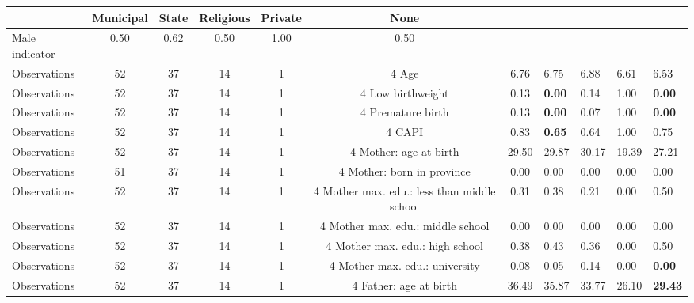 \begin{tabular}{l c c c c c c }
\toprule
& \textbf{Municipal} & \textbf{State} & \textbf{Religious} & \textbf{Private} & \textbf{None} \\
\midrule
Male indicator &      0.50 &      0.62 &      0.50 &      1.00 &      0.50 \\
\midrule
Observations &        52 &        37 &        14 &         1 &         4
Age &      6.76 &      6.75 &      6.88 &      6.61 &      6.53 \\
\midrule
Observations &        52 &        37 &        14 &         1 &         4
Low birthweight &      0.13 & \textbf{     0.00} &      0.14 &      1.00 & \textbf{     0.00} \\
\midrule
Observations &        52 &        37 &        14 &         1 &         4
Premature birth &      0.13 & \textbf{     0.00} &      0.07 &      1.00 & \textbf{     0.00} \\
\midrule
Observations &        52 &        37 &        14 &         1 &         4
CAPI &      0.83 & \textbf{     0.65} &      0.64 &      1.00 &      0.75 \\
\midrule
Observations &        52 &        37 &        14 &         1 &         4
Mother: age at birth &     29.50 &     29.87 &     30.17 &     19.39 &     27.21 \\
\midrule
Observations &        51 &        37 &        14 &         1 &         4
Mother: born in province &      0.00 &      0.00 &      0.00 &      0.00 &      0.00 \\
\midrule
Observations &        52 &        37 &        14 &         1 &         4
Mother max. edu.: less than middle school &      0.31 &      0.38 &      0.21 &      0.00 &      0.50 \\
\midrule
Observations &        52 &        37 &        14 &         1 &         4
Mother max. edu.: middle school &      0.00 &      0.00 &      0.00 &      0.00 &      0.00 \\
\midrule
Observations &        52 &        37 &        14 &         1 &         4
Mother max. edu.: high school &      0.38 &      0.43 &      0.36 &      0.00 &      0.50 \\
\midrule
Observations &        52 &        37 &        14 &         1 &         4
Mother max. edu.: university &      0.08 &      0.05 &      0.14 &      0.00 & \textbf{     0.00} \\
\midrule
Observations &        52 &        37 &        14 &         1 &         4
Father: age at birth &     36.49 &     35.87 &     33.77 &     26.10 & \textbf{    29.43} \\

\end{tabular}
